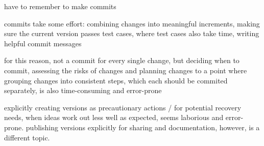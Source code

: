 have to remember to make commits

commits take some effort: combining changes into meaningful increments, making sure the current version passes test cases, where test cases also take time, writing helpful commit messages

for this reason, not a commit for every single change, but deciding when to commit, assessing the risks of changes and planning changes to a point where grouping changes into consistent steps, which each should be commited separately, is also time-consuming and error-prone

explicitly creating versions as precautionary actions / for potential recovery needs, when ideas work out less well as expected, seems laborious and error-prone.
publishing versions explicitly for sharing and documentation, however, is a different topic.




% 
% 
% 
% 
% 
